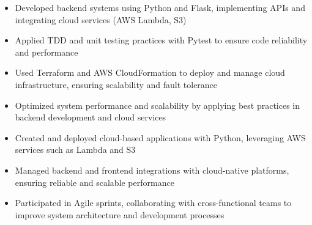 \par\smallskip
\begin{minipage}{13.75cm}
  \begin{minipage}{6.5cm}
    \begin{itemize}
      \item Developed backend systems using Python and Flask, implementing APIs and integrating cloud services (AWS Lambda, S3)
      \item Applied TDD and unit testing practices with Pytest to ensure code reliability and performance
    \end{itemize}
  \end{minipage}
  \hfill
  \begin{minipage}{6.5cm}
    \begin{itemize}
      \item Used Terraform and AWS CloudFormation to deploy and manage cloud infrastructure, ensuring scalability and fault tolerance
      \item Optimized system performance and scalability by applying best practices in backend development and cloud services
    \end{itemize}
  \end{minipage}
\end{minipage}
\par\smallskip
\divider

\par\smallskip
\begin{minipage}{13.75cm}
  \begin{minipage}{6.5cm}
    \begin{itemize}
      \item Created and deployed cloud-based applications with Python, leveraging AWS services such as Lambda and S3
      \item Managed backend and frontend integrations with cloud-native platforms, ensuring reliable and scalable performance
    \end{itemize}
  \end{minipage}
  \hfill
  \begin{minipage}{6.5cm}
    \begin{itemize}
      \item Participated in Agile sprints, collaborating with cross-functional teams to improve system architecture and development processes
    \end{itemize}
  \end{minipage}
\end{minipage}

